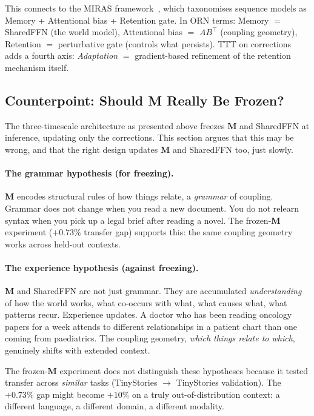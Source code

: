 \documentclass[11pt, a4paper]{article}
\newcommand{\M}{\mathbf{M}}
\theoremstyle{plain}
\theoremstyle{definition}
\theoremstyle{remark}
\begin{document}
This connects to the MIRAS framework~\cite{miras2025}, which taxonomises sequence models as Memory + Attentional bias + Retention gate.
In ORN terms: Memory $=$ SharedFFN (the world model), Attentional bias $=$ $AB^\top$ (coupling geometry), Retention $=$ perturbative gate (controls what persists).
TTT on corrections adds a fourth axis: \emph{Adaptation} $=$ gradient-based refinement of the retention mechanism itself.

\subsection{Counterpoint: Should M Really Be Frozen?}
\label{sec:frozen-counterpoint}

The three-timescale architecture as presented above freezes $\M$ and SharedFFN at inference, updating only the corrections.
This section argues that this may be wrong, and that the right design updates $\M$ and SharedFFN too, just slowly.

\paragraph{The grammar hypothesis (for freezing).}
$\M$ encodes structural rules of how things relate, a \emph{grammar} of coupling.
Grammar does not change when you read a new document.
You do not relearn syntax when you pick up a legal brief after reading a novel.
The frozen-$\M$ experiment ($+0.73\%$ transfer gap) supports this: the same coupling geometry works across held-out contexts.

\paragraph{The experience hypothesis (against freezing).}
$\M$ and SharedFFN are not just grammar.
They are accumulated \emph{understanding} of how the world works, what co-occurs with what, what causes what, what patterns recur.
Experience updates.
A doctor who has been reading oncology papers for a week attends to different relationships in a patient chart than one coming from paediatrics.
The coupling geometry, \emph{which things relate to which}, genuinely shifts with extended context.

The frozen-$\M$ experiment does not distinguish these hypotheses because it tested transfer across \emph{similar} tasks (TinyStories $\to$ TinyStories validation).
The $+0.73\%$ gap might become $+10\%$ on a truly out-of-distribution context: a different language, a different domain, a different modality.
\end{document}
